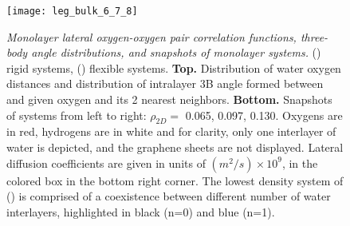 \documentclass[12pt]{article}
\begin{document}
\begin{figure}[ht!]
	\centering
	\texttt{[image: leg\_bulk\_6\_7\_8]}\\
	\caption{\textit{Monolayer lateral oxygen-oxygen pair correlation functions, three-body angle distributions, and snapshots of monolayer systems.} (\protect{}) rigid systems, (\protect{}) flexible systems.  \textbf{Top.} Distribution of water oxygen distances and distribution of intralayer 3B angle formed between and given oxygen and its 2 nearest neighbors. \textbf{Bottom.} Snapshots of systems from left to right: \(\rho_{2D}=\) 0.065, 0.097, 0.130. Oxygens are in red, hydrogens are in white and for clarity, only one interlayer of water is depicted, and the graphene sheets are not displayed. Lateral diffusion coefficients are given in units of \((m^2/s) \times 10^9\), in the colored box in the bottom right corner. The lowest density system of (\protect{}) is comprised of a coexistence between different number of water interlayers, highlighted in black (n=0) and blue (n=1).}
	\label{fig:struct_6_7_8}
\end{figure}
\end{document}
